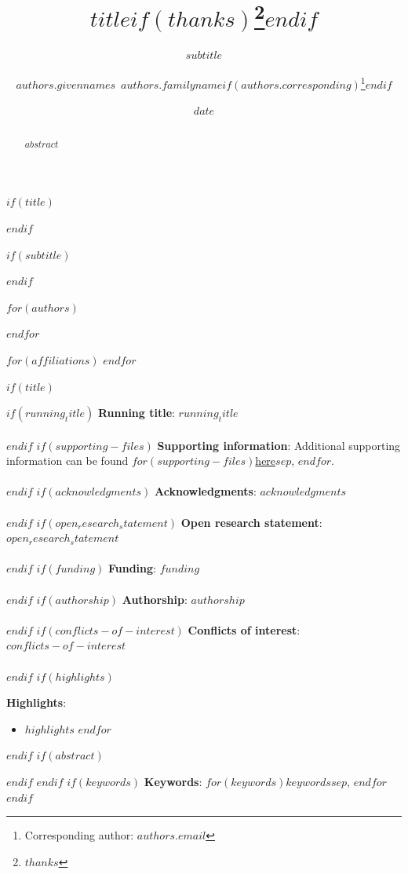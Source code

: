 \documentclass[11pt]{article}
\begin{document}
$if(title)$
\title{$title$$if(thanks)$\thanks{$thanks$}$endif$}
$endif$

$if(subtitle)$
\subtitle{$subtitle$}
$endif$

$for(authors)$
\author[$for(authors.affiliations)$$authors.affiliations$$sep$,$endfor$]{$authors.givennames$~$authors.familyname$$if(authors.corresponding)$\thanks{Corresponding author: $authors.email$}$endif$}
$endfor$

$for(affiliations)$
$endfor$

\date{$date$}

$if(title)$
\maketitle
$if(running_title)$
\small{{\bf Running title}: $running_title$}\\\\
$endif$
$if(supporting-files)$
\small{{\bf Supporting information}: Additional supporting information can be found $for(supporting-files)$\href{https://$github-user$.github.io/$github-user$/$supporting-files$.pdf}{here}$sep$, $endfor$.}\\\\
$endif$
$if(acknowledgments)$
\small{{\bf Acknowledgments}: $acknowledgments$}\\\\
$endif$
$if(open_research_statement)$
\small{{\bf Open research statement}: $open_research_statement$}\\\\
$endif$
$if(funding)$
\small{{\bf Funding}: $funding$}\\\\
$endif$
$if(authorship)$
\small{{\bf Authorship}: $authorship$}\\\\
$endif$
$if(conflicts-of-interest)$
\small{{\bf Conflicts of interest}: $conflicts-of-interest$}\\\\
$endif$
$if(highlights)$
\small{{\bf Highlights}:\vspace{-1.5em}
\begin{itemize}
  $for(highlights)$
    \item $highlights$
  $endfor$
\end{itemize}}
$endif$
$if(abstract)$
\begin{abstract}
$abstract$
\end{abstract}
$endif$
$endif$
$if(keywords)$
\hspace{1cm}\small{{\bf Keywords}: $for(keywords)$$keywords$$sep$, $endfor$}
$endif$
\end{document}
